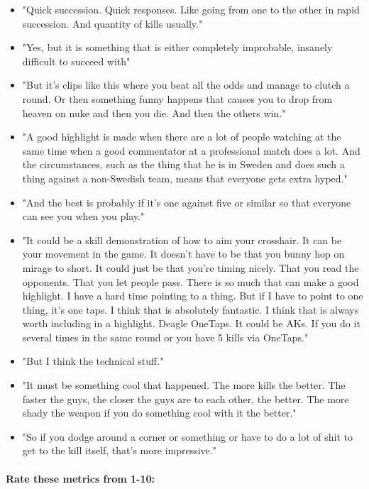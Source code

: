 \begin{itemize}
    \item "Quick succession. Quick responses. Like going from one to the other in rapid succession. And quantity of kills usually."
    \item "Yes, but it is something that is either completely improbable, insanely difficult to succeed with"
    \item "But it's clips like this where you beat all the odds and manage to clutch a round. Or then something funny happens that causes you to drop from heaven on nuke and then you die. And then the others win."
    \item "A good highlight is made when there are a lot of people watching at the same time when a good commentator at a professional match does a lot. And the circumstances, such as the thing that he is in Sweden and does such a thing against a non-Swedish team, means that everyone gets extra hyped."
    \item "And the best is probably if it's one against five or similar so that everyone can see you when you play."
    \item "It could be a skill demonstration of how to aim your crosshair. It can be your movement in the game. It doesn't have to be that you bunny hop on mirage to short. It could just be that you're timing nicely. That you read the opponents. That you let people pass. There is so much that can make a good highlight. I have a hard time pointing to a thing. But if I have to point to one thing, it's one taps. I think that is absolutely fantastic. I think that is always worth including in a highlight. Deagle OneTaps. It could be AKs. If you do it several times in the same round or you have 5 kills via OneTaps."
    \item "But I think the technical stuff."
    \item "It must be something cool that happened. The more kills the better. The faster the guys, the closer the guys are to each other, the better. The more shady the weapon if you do something cool with it the better."
    \item "So if you dodge around a corner or something or have to do a lot of shit to get to the kill itself, that's more impressive."
\end{itemize}

\paragraph{Rate these metrics from 1-10:}

